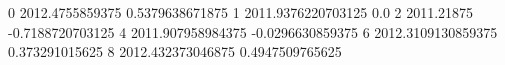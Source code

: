 0 2012.4755859375 0.5379638671875
1 2011.9376220703125 0.0
2 2011.21875 -0.7188720703125
4 2011.907958984375 -0.0296630859375
6 2012.3109130859375 0.373291015625
8 2012.432373046875 0.4947509765625
